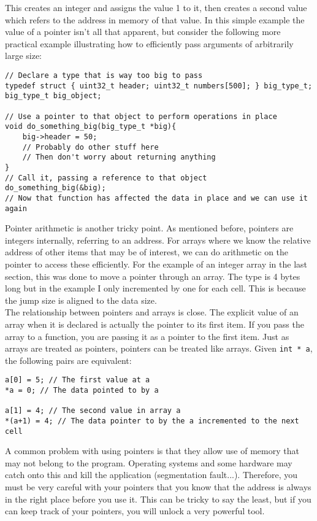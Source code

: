 \documentclass[10pt]{article}
\begin{document}
This creates an integer and assigns the value 1 to it, then creates a second value which refers to the address in memory of that value. In this simple example the value of a pointer isn't all that apparent, but consider the following more practical example illustrating how to efficiently pass arguments of arbitrarily large size:

\begin{lstlisting}[label=lst-pointer-param,caption=Pointers as parameters]
// Declare a type that is way too big to pass
typedef struct { uint32_t header; uint32_t numbers[500]; } big_type_t;
big_type_t big_object;

// Use a pointer to that object to perform operations in place
void do_something_big(big_type_t *big){
	big->header = 50;
	// Probably do other stuff here
	// Then don't worry about returning anything
}
// Call it, passing a reference to that object
do_something_big(&big);
// Now that function has affected the data in place and we can use it again
\end{lstlisting}

Pointer arithmetic is another tricky point. As mentioned before, pointers are integers internally, referring to an address. For arrays where we know the relative address of other items that may be of interest, we can do arithmetic on the pointer to access these efficiently. For the example of an integer array in the last section, this was done to move a pointer through an array. The type is 4 bytes long but in the example I only incremented by one for each cell. This is because the jump size is aligned to the data size. \\

The relationship between pointers and arrays is close. The explicit value of an array when it is declared is actually the pointer to its first item. If you pass the array to a function, you are passing it as a pointer to the first item. Just as arrays are treated as pointers, pointers can be treated like arrays. Given \texttt{int * a}, the following pairs are equivalent:

\begin{lstlisting}[label=lst-pointers-as-arrays,caption=Pointers as arrays]
a[0] = 5; // The first value at a
*a = 0; // The data pointed to by a

a[1] = 4; // The second value in array a
*(a+1) = 4; // The data pointer to by the a incremented to the next cell
\end{lstlisting}

A common problem with using pointers is that they allow use of memory that may not belong to the program. Operating systems and some hardware may catch onto this and kill the application (segmentation fault...). Therefore, you must be very careful with your pointers that you know that the address is always in the right place before you use it. This can be tricky to say the least, but if you can keep track of your pointers, you will unlock a very powerful tool. \\
\end{document}
